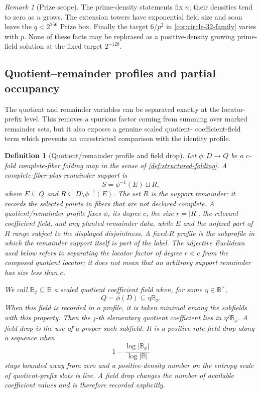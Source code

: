 \documentclass[11pt,a4paper]{amsart}
\numberwithin{equation}{section}
\newtheorem{definition}[definition]{Definition}
\theoremstyle{remark}
\newtheorem{remark}[remark]{Remark}
\newcommand{\B}{\mathbb B}
\newcommand{\abs}[1]{\lvert #1\rvert}
\begin{document}
\begin{remark}[Prize scope]
The prime-density statements fix \(n\); their densities tend to zero as
\(n\) grows.  The extension towers have exponential field size and soon
leave the \(q<2^{256}\) Prize box.  Finally the target \(6/p^2\) in
\cref{cor:circle-32-family} varies with \(p\).  None of these facts may be
rephrased as a positive-density growing prime-field solution at the fixed
target \(2^{-128}\).
\end{remark}

\subsection{Quotient--remainder profiles and partial occupancy}
\label{sec:quotient-obstruction}

The quotient and remainder variables can be separated exactly at the
locator-prefix level.  This removes a spurious factor coming from summing
over marked remainder sets, but it also exposes a genuine scaled quotient-
coefficient-field term which prevents an unrestricted comparison with the
identity profile.

\begin{definition}[Quotient/remainder profile and field drop]
\label{def:quotient-remainder-profile}
Let \(\phi:D\to Q\) be a \(c\)-fold complete-fiber folding map in the
sense of \cref{def:structured-folding}.  A
\emph{complete-fiber-plus-remainder support} is
\[
                  S=\phi^{-1}(E)\sqcup R,
\]
where \(E\subseteq Q\) and
\(R\subseteq D\setminus\phi^{-1}(E)\).  The set \(R\) is the
\emph{support remainder}: it records the selected points in fibers that
are not declared complete.  A \emph{quotient/remainder profile} fixes
\(\phi\), its degree \(c\), the size \(r=\abs R\), the relevant
coefficient field, and any planted remainder data, while \(E\) and the
unfixed part of \(R\) range subject to the displayed disjointness.
A fixed-\(R\) profile is the subprofile in which the remainder support
itself is part of the label.  The adjective \emph{Euclidean} used below
refers to separating the locator factor of degree \(r<c\) from the
composed quotient locator; it does not mean that an arbitrary support
remainder has size less than \(c\).

We call \(\B_\phi\subseteq\B\) a \emph{scaled quotient coefficient
field} when, for some \(\eta\in\B^\times\),
\[
                         Q=\phi(D)\subseteq\eta\B_\phi .
\]
When this field is recorded in a profile, it is taken minimal among the
subfields with this property.
Then the \(j\)-th elementary quotient coefficient lies in
\(\eta^j\B_\phi\).  A \emph{field drop} is the use of a proper such
subfield.  It is a \emph{positive-rate field drop} along a sequence when
\[
       1-\frac{\log\abs{\B_\phi}}{\log\abs\B}
\]
stays bounded away from zero and a positive-density number on the
entropy scale of quotient-prefix slots is live.  A field drop changes the number of available coefficient values and is therefore recorded explicitly.
\end{definition}
\end{document}
